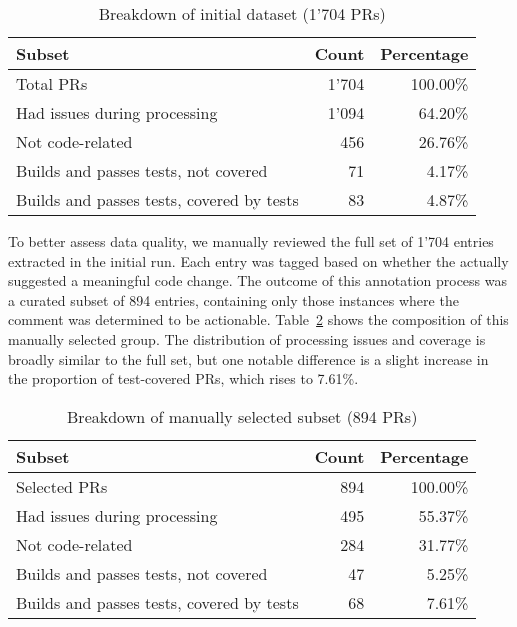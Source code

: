 \begin{table}[ht]
	\centering
	\begin{tabular}{lrr}
		\toprule
		\textbf{Subset}                           & \textbf{Count} & \textbf{Percentage} \\
		\midrule
		Total PRs                                 & 1'704          & 100.00\%            \\
		Had issues during processing              & 1'094          & 64.20\%             \\
		Not code-related                          & 456            & 26.76\%             \\
		Builds and passes tests, not covered      & 71             & 4.17\%              \\
		Builds and passes tests, covered by tests & 83             & 4.87\%              \\
		\bottomrule
	\end{tabular}
	\caption{Breakdown of initial dataset (1'704 PRs)}
	\label{tab:initial-distribution}
\end{table}

To better assess data quality, we manually reviewed the full set of 1'704 entries extracted in the
initial run. Each entry was tagged based on whether the \revComment actually suggested a meaningful
code change. The outcome of this annotation process was a curated subset of 894 entries, containing
only those instances where the comment was determined to be actionable.
Table~\ref{tab:manual-selection-distribution} shows the composition of this manually selected group.
The distribution of processing issues and coverage is broadly similar to the full set, but one
notable difference is a slight increase in the proportion of test-covered PRs, which rises to
7.61\%.

\begin{table}[ht]
	\centering
	\begin{tabular}{lrr}
		\toprule
		\textbf{Subset}                           & \textbf{Count} & \textbf{Percentage} \\
		\midrule
		Selected PRs                              & 894            & 100.00\%            \\
		Had issues during processing              & 495            & 55.37\%             \\
		Not code-related                          & 284            & 31.77\%             \\
		Builds and passes tests, not covered      & 47             & 5.25\%              \\
		Builds and passes tests, covered by tests & 68             & 7.61\%              \\
		\bottomrule
	\end{tabular}
	\caption{Breakdown of manually selected subset (894 PRs)}
	\label{tab:manual-selection-distribution}
\end{table}


